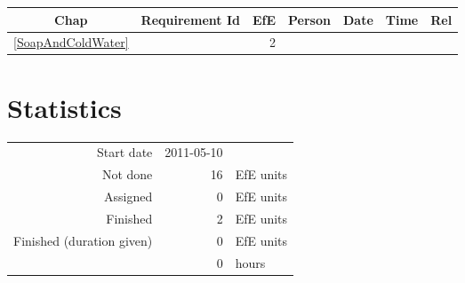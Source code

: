 {\small \begin{longtable}{|c|p{5.5cm}||r|l|l|r|r|} \hline
\textbf{Chap} & \textbf{Requirement Id} & \textbf{EfE} & \textbf{Person} & \textbf{Date} & \textbf{Time} & \textbf{Rel} \\ \hline\endhead
\ref{SoapAndColdWater} & \nameref{SoapAndColdWater} & 2 & \  &  & \  & \  \\ \hline
\end{longtable}}\section{Statistics}
\begin{longtable}{rrl}
Start date & 2011-05-10 & \\ 
Not done & 16 & EfE units \\ 
Assigned & 0 & EfE units \\ 
Finished & 2 & EfE units \\ 
Finished (duration given) & 0 & EfE units \\ 
 & 0 & hours \\ 
\end{longtable}